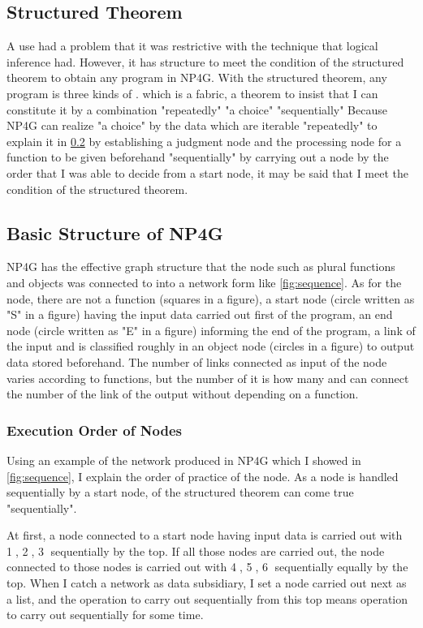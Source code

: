 \documentclass{article}
\begin{document}
\subsection {Structured Theorem}
A use had a problem that it was restrictive with the technique that logical inference had.
However, it has structure to meet the condition of the structured theorem to obtain any program in NP4G.
With the structured theorem, any program is three kinds of \cite{StructuredProgramming}. which is a fabric, a theorem to insist that I can constitute it by a combination "repeatedly" "a choice" "sequentially"
Because NP4G can realize "a choice" by the data which are iterable "repeatedly" to explain it in \ref{sec:struct} by establishing a judgment node and the processing node for a function to be given beforehand "sequentially" by carrying out a node by the order that I was able to decide from a start node, it may be said that I meet the condition of the structured theorem.

\subsection{Basic Structure of NP4G}
\label{sec:struct}
NP4G has the effective graph structure that the node such as plural functions and objects was connected to into a network form like \ref{fig:sequence}.
As for the node, there are not a function (squares in a figure), a start node (circle written as "S" in a figure) having the input data carried out first of the program, an end node (circle written as "E" in a figure) informing the end of the program, a link of the input and is classified roughly in an object node (circles in a figure) to output data stored beforehand.
The number of links connected as input of the node varies according to functions, but the number of it is how many and can connect the number of the link of the output without depending on a function.

\subsubsection {Execution Order of Nodes}
\label{sec:sequence}
Using an example of the network produced in NP4G which I showed in \ref{fig:sequence}, I explain the order of practice of the node.
As a node is handled sequentially by a start node, of the structured theorem can come true "sequentially".

At first, a node connected to a start node having input data is carried out with \textcircled{\scriptsize 1}, \textcircled{\scriptsize 2}, \textcircled{\scriptsize 3} sequentially by the top.
If all those nodes are carried out, the node connected to those nodes is carried out with \textcircled{\scriptsize 4}, \textcircled{\scriptsize 5}, \textcircled{\scriptsize 6} sequentially equally by the top.
When I catch a network as data subsidiary, I set a node carried out next as a list, and the operation to carry out sequentially from this top means operation to carry out sequentially for some time.
\end{document}
